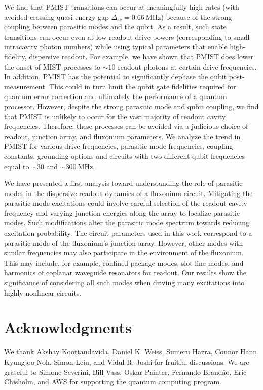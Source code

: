 \documentclass[%
reprint,
superscriptaddress,
 amsmath,amssymb,
 aps,
 prx,
longbibliography,
floatfix,
]{revtex4-2}
\begin{document}
We find that PMIST transitions can occur at meaningfully high rates (with avoided crossing quasi-energy gap $\Delta_{\textrm{ac}}=0.66 \ \textrm{MHz}$) because of the strong coupling between parasitic modes and the qubit. As a result, such state transitions can occur even at low readout drive powers (corresponding to small intracavity photon numbers) while using typical parameters that enable high-fidelity, dispersive readout. For example, we have shown that PMIST does lower the onset of MIST processes to $\sim 10$ readout photons at certain drive frequencies. In addition, PMIST has the potential to significantly dephase the qubit post-measurement. This could in turn limit the qubit gate fidelities required for quantum error correction and ultimately the performance of a quantum processor. However, despite the strong parasitic mode and qubit coupling, we find that PMIST is unlikely to occur for the vast majority of readout cavity frequencies. Therefore, these processes can be avoided via a judicious choice of readout, junction array, and fluxonium parameters. We analyze the trend in PMIST for various drive frequencies, parasitic mode frequencies, coupling constants, grounding options and circuits with two different qubit frequencies equal to $\sim 30$ and $\sim 300 \ \mathrm{MHz}$.


We have presented a first analysis toward understanding the role of parasitic modes in the dispersive readout dynamics of a fluxonium circuit. Mitigating the parasitic mode excitations could involve careful selection of the readout cavity frequency and varying junction energies along the array to localize parasitic modes. Such modifications alter the parasitic mode spectrum towards reducing excitation probability. The circuit parameters used in this work correspond to a parasitic mode of the fluxonium's junction array. However, other modes with similar frequencies may also participate in the environment of the fluxonium. This may include, for example, confined package modes, slot line modes, and harmonics of coplanar waveguide resonators for readout. Our results show the significance of considering all such modes when driving many excitations into highly nonlinear circuits.

\section{Acknowledgments}
 We thank Akshay Koottandavida, Daniel K. Weiss, Sumeru Hazra, Connor Hann, Kyungjoo Noh, Simon Leiu, and Vidul R. Joshi for fruitful discussions. We are grateful to Simone Severini, Bill Vass, Oskar Painter, Fernando Brand\~ao, Eric Chisholm, and AWS for supporting the quantum computing program. %
\appendix
\end{document}
